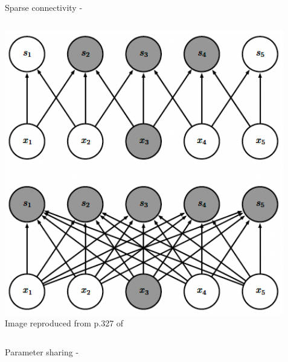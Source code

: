 \begin{frame}[t,allowframebreaks]{Sparse connectivity -}
    \framebreak

    \begin{columns}
        \begin{column}{0.50\textwidth}
         \begin{center}
          \includegraphics[width=1.0\textwidth]
          {./images/cnn/sparse_connectivity/goodfellow17_sparse_connectivity_from_below_01.png}\\
          {\scriptsize \color{col:attribution} 
          Image reproduced from p.327 of \cite{Goodfellow:2017MITDL}}\\
         \end{center}
        \end{column}
        \begin{column}{0.50\textwidth}
        \end{column}
    \end{columns}

\end{frame}

%
%
%

\begin{frame}[t,allowframebreaks]{Parameter sharing -}

\end{frame}

%
%
%


